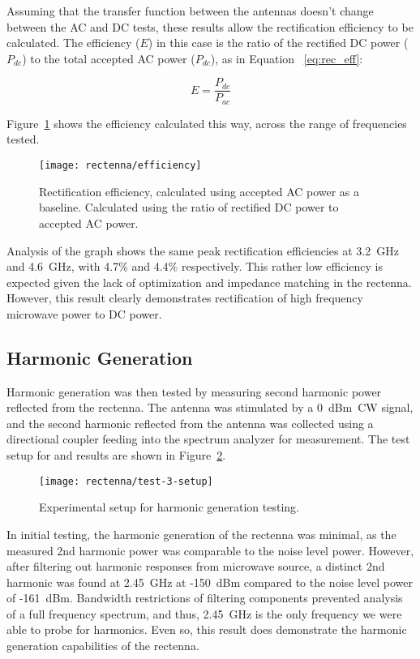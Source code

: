 Assuming that the transfer function between the antennas doesn't change between the AC and DC tests, these results allow the rectification efficiency to be calculated. The efficiency ($E$) in this case is the ratio of the rectified DC power ($P_{dc}$) to the total accepted AC power ($P_{dc}$), as in Equation ~\ref{eq:rec_eff}:

\begin{equation}
E = \frac{P_{dc}}{P_{ac}}
\label{eq:rec_eff}
\end{equation}

Figure~\ref{fig:rectenna-efficiency} shows the efficiency calculated this way, across the range of frequencies tested.

\begin{figure}[h!]
\centering
\texttt{[image: rectenna/efficiency]}
    \caption[Rectification efficiency]{Rectification efficiency, calculated using accepted AC power as a baseline. Calculated using the ratio of rectified DC power to accepted AC power.}
    \label{fig:rectenna-efficiency}
\end{figure}

Analysis of the graph shows the same peak rectification efficiencies at 3.2~GHz and 4.6~GHz, with 4.7\% and 4.4\% respectively. This rather low efficiency is expected given the lack of optimization and impedance matching in the rectenna. However, this result clearly demonstrates rectification of high frequency microwave power to DC power.

\subsection{Harmonic Generation}

Harmonic generation was then tested by measuring second harmonic power reflected from the rectenna. The antenna was stimulated by a 0~dBm~CW signal, and the second harmonic reflected from the antenna was collected using a directional coupler feeding into the spectrum analyzer for measurement. The test setup for and results are shown in Figure~\ref{fig:rectenna-test-3-setup}.

\begin{figure}[h!]
\centering
\texttt{[image: rectenna/test-3-setup]}
\caption{Experimental setup for harmonic generation testing.}
\label{fig:rectenna-test-3-setup}
\end{figure}

In initial testing, the harmonic generation of the rectenna was minimal, as the measured 2nd harmonic power was comparable to the noise level power. However, after filtering out harmonic responses from microwave source, a distinct 2nd harmonic was found at 2.45~GHz at -150~dBm compared to the noise level power of -161~dBm. Bandwidth restrictions of filtering components prevented analysis of a full frequency spectrum, and thus, 2.45~GHz is the only frequency we were able to probe for harmonics. Even so, this result does demonstrate the harmonic generation capabilities of the rectenna.

